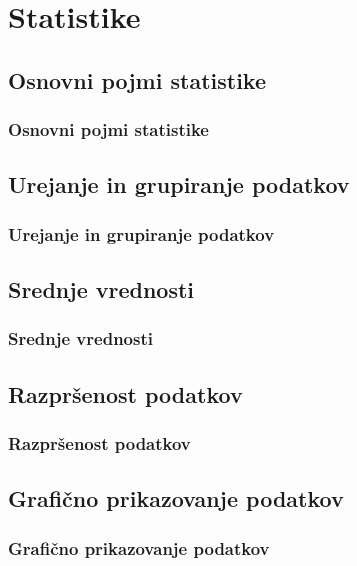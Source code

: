 \section{Statistike}

\begin{frame}
    \sectionpage
\end{frame}

\begin{frame}
\end{frame}


    \subsection{Osnovni pojmi statistike}

        \begin{frame}
            \frametitle{Osnovni pojmi statistike}
        \end{frame}


    \subsection{Urejanje in grupiranje podatkov}

        \begin{frame}
            \frametitle{Urejanje in grupiranje podatkov}
        \end{frame}


    \subsection{Srednje vrednosti}

        \begin{frame}
            \frametitle{Srednje vrednosti}
        \end{frame}

    \subsection{Razpršenost podatkov}

        \begin{frame}
            \frametitle{Razpršenost podatkov}
        \end{frame}

    \subsection{Grafično prikazovanje podatkov}
        
        \begin{frame}
            \frametitle{Grafično prikazovanje podatkov}
        \end{frame}